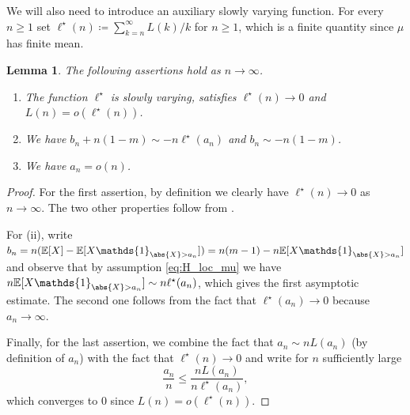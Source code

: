 \documentclass[a4paper,11pt]{article}
\DeclareRobustCommand{\E}{\mathbb{E}}
\DeclareRobustCommand{\R}{\mathbb{R}}
\newtheorem{lemma}[theorem]{Lemma}
\begin{document}
%
        We will also need to introduce an auxiliary slowly varying function. For every $n \geq 1$ set $\ell^\star(n) \coloneqq \sum_{k=n}^\infty L(k)/k$ for $n \geq 1$, which is a finite quantity since $\mu$ has finite mean.
        
        \begin{lemma}
        \label{lem:bnan} The following assertions hold as $n\rightarrow \infty$.
        \begin{enumerate}
        \item[(i)]  The function $\ell^{\star}$ is slowly varying, satisfies $\ell^{\star}(n) \rightarrow 0$ and  $L(n) = o(\ell^\star(n))$.
        \item[(ii)] We have $b_{n}+ n(1-m) \sim - n \ell^{\star}(a_{n})$ and $b_n \sim - n(1-m)$.
        \item[(iii)] We have  $a_n = o(n)$.
        \end{enumerate}
        \end{lemma}

\begin{proof}
 For the first assertion, by definition we clearly have $\ell^{\star}(n) \rightarrow 0$ as $n \rightarrow \infty$. The two other properties follow from  \cite[Proposition 1.5.9b]{Bingham_Goldie_Teugels_1987}.
 
 For (ii),  write
$b_{n}=n(\E[X]-\E[X \mathds{1}_{\abs{X}>a_n}]) =n(m-1)-n\E[X \mathds{1}_{\abs{X}>a_n}]
$
and observe that by assumption \eqref{eq:H_loc_mu} we have $n\E[X \mathds{1}_{\abs{X}>a_n}] \sim n \ell^\star(a_n)$, which gives the first asymptotic estimate. The second one follows from the fact that $\ell^\star(a_n) \rightarrow 0$ because $a_{n} \rightarrow \infty$.

Finally, for the last assertion, we combine the fact that $a_{n} \sim n L(a_{n})$ (by definition of $a_{n}$) with the fact that $\ell^{\star}(n) \rightarrow 0$ and write for $n$ sufficiently large
$$ \frac{a_{n}}{n} \leq  \frac{n L(a_{n})}{n \ell^{\star}(a_{n})},$$
which converges to $0$ since $L(n) = o(\ell^\star(n))$.
\end{proof}
\end{document}
